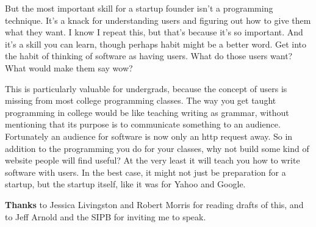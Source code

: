 But the most important skill for a startup founder isn't a programming
technique. It's a knack for understanding users and figuring out how to
give them what they want. I know I repeat this, but that's because it's
so important. And it's a skill you can learn, though perhaps habit might
be a better word. Get into the habit of thinking of software as having
users. What do those users want? What would make them say wow?

This is particularly valuable for undergrads, because the concept of
users is missing from most college programming classes. The way you get
taught programming in college would be like teaching writing as grammar,
without mentioning that its purpose is to communicate something to an
audience. Fortunately an audience for software is now only an http
request away. So in addition to the programming you do for your classes,
why not build some kind of website people will find useful? At the very
least it will teach you how to write software with users. In the best
case, it might not just be preparation for a startup, but the startup
itself, like it was for Yahoo and Google.


\textbf{Thanks} to Jessica Livingston and Robert Morris for reading
drafts of this, and to Jeff Arnold and the SIPB for inviting me to
speak.